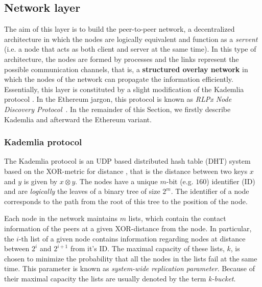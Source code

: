 \subsection{Network layer}
\label{sec:network-layer}

The aim of this layer is to build the peer-to-peer network, a decentralized
architecture in which the nodes are logically equivalent and function as a
\emph{servent} (i.e. a node that acts as both client and server at the same
time). In this type of architecture, the nodes are formed by processes and the
links represent the possible communication channels, that is, a
\textbf{structured overlay network} \cite{van2017distributed} in which the nodes
of the network can propagate the information efficiently. Essentially, this
layer is constituted by a slight modification of the Kademlia protocol
\cite{bib:kademlia}. In the Ethereum jargon, this protocol is known as
\emph{RLPx Node Discovery Protocol}~\cite{bib:rlpx-discovery-protocol}. In the
remainder of this Section, we firstly describe Kademlia and afterward the
Ethereum variant.


\subsubsection{Kademlia protocol}
The Kademlia protocol is an UDP based distributed hash table (DHT) system based
on the XOR-metric for distance \cite{bib:kademlia}, that is the distance between
two keys $x$ and $y$ is given by $x \otimes y$. The nodes have a unique $m$-bit
(e.g. $160$) identifier (ID) and are \emph{logically} the leaves of a binary
tree of size $2^m$. The identifier of a node corresponds to the path from the
root of this tree to the position of the node.

Each node in the network maintains $m$ lists, which contain the contact
information of the peers at a given XOR-distance from the node. In particular,
the $i$-th list of a given node contains information regarding nodes at distance
between $2^i$ and $2^{i+1}$ from it's ID. The maximal capacity of these lists,
$k$, is chosen to minimize the probability that all the nodes in the lists fail
at the same time. This parameter is  known as \emph{system-wide replication
parameter}. Because of their maximal capacity the lists are usually denoted by
the term \emph{k-bucket}.


